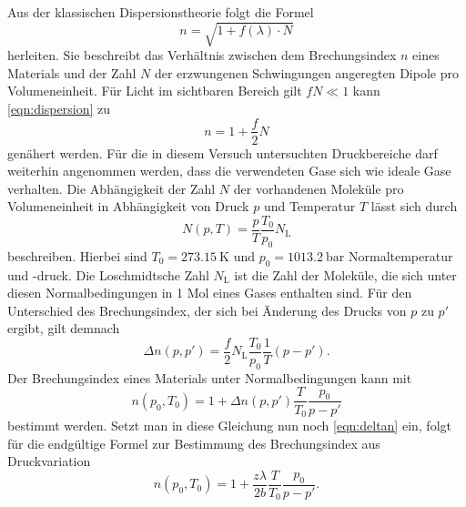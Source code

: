 Aus der klassischen Dispersionstheorie folgt die Formel
\begin{equation}
    n = \sqrt{1 + f(\lambda) \cdot N}
    \label{eqn:dispersion}
\end{equation}
herleiten. Sie beschreibt das Verhältnis zwischen dem Brechungsindex $n$ eines Materials und der Zahl $N$ der erzwungenen 
Schwingungen angeregten Dipole pro Volumeneinheit. Für Licht im sichtbaren Bereich gilt $fN \ll 1$ kann \autoref{eqn:dispersion}
zu 
\begin{equation}
    n = 1 + \frac{f}{2} N
\end{equation}
genähert werden. Für die in diesem Versuch untersuchten Druckbereiche darf weiterhin angenommen werden, dass die verwendeten Gase 
sich wie ideale Gase verhalten. Die Abhängigkeit der Zahl $N$ der vorhandenen Moleküle pro Volumeneinheit in Abhängigkeit von Druck $p$ und 
Temperatur $T$ lässt sich durch
\begin{equation}
    N(p,T) = \frac{p}{T} \frac{T_0}{p_0} N_\text{L}
\end{equation}
beschreiben. Hierbei sind $T_0 = \SI{273,15}{\kelvin}$ und $p_0 = \SI{1013,2}{\bar}$ Normaltemperatur und -druck. 
Die Loschmidtsche Zahl $N_\text{L}$ ist die Zahl der Moleküle, die sich unter diesen Normalbedingungen in 1 Mol eines
Gases enthalten sind. 
Für den Unterschied des Brechungsindex, der sich bei Änderung des Drucks von $p$ zu $p'$ ergibt, gilt demnach
\begin{equation}
    \Delta n(p,p') = \frac{f}{2} N_\text{L} \frac{T_0}{p_0} \frac{1}{T} (p-p') .
\end{equation}
Der Brechungsindex eines Materials unter Normalbedingungen kann mit
\begin{equation}
    n(p_0,T_0) = 1 + \Delta n (p,p') \frac{T}{T_0} \frac{p_0}{p-p'}
\end{equation}
bestimmt werden. Setzt man in diese Gleichung nun noch \autoref{eqn:deltan} ein, folgt für die endgültige Formel zur Bestimmung des
Brechungsindex aus Druckvariation
\begin{equation}
    n(p_0, T_0) = 1 + \frac{z\lambda}{2b} \frac{T}{T_0} \frac{p_0}{p-p'} .
\end{equation}